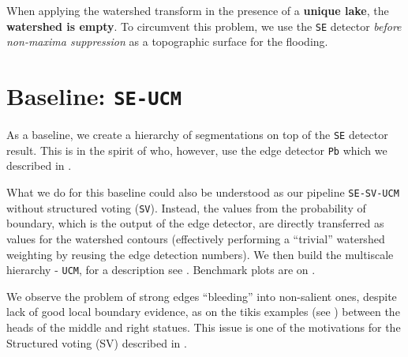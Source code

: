 When applying the watershed transform in the presence of a {\bf unique lake}, the {\bf watershed is empty}. To circumvent this problem, we use the {\tt SE} detector {\it before non-maxima suppression} as a topographic surface for the flooding.

\section{Baseline: {\tt SE-UCM}}
\label{sec:ch5-SE-UCM-baseline}
As a baseline, we create a hierarchy of segmentations on top of the {\tt SE} detector result. This is in the spirit of \cite{Arbelaez2006boundary} who, however, use the edge detector {\tt Pb} which we described in . 

What we do for this baseline could also be understood %
as our pipeline {\tt SE-SV-UCM} without structured voting ({\tt SV}). Instead, the values from the probability of boundary, which is the output of the edge detector, are directly transferred as values for the watershed contours (effectively performing a ``trivial'' watershed weighting by reusing the edge detection numbers). %
We then build the multiscale hierarchy - {\tt UCM}, for a description see . Benchmark plots are on .

We observe the problem of strong edges ``bleeding'' into non-salient ones, despite lack of good local boundary evidence, as on the tikis examples (see ) between the heads of the middle and right statues. This issue is one of the motivations for the Structured voting (SV) described in .%

